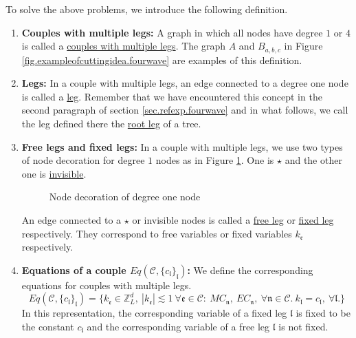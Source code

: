 To solve the above problems, we introduce the following definition.

\begin{defn}\label{def.couplemultileg.fourwave}
\begin{enumerate}
 \item \textbf{Couples with multiple legs:} A graph in which all nodes have degree $1$ or $4$ is called a \underline{couples with multiple legs}. The graph $A$ and $B_{a,b,c}$ in Figure \ref{fig.exampleofcuttingidea.fourwave} are examples of this definition.
 \item \textbf{Legs:} In a couple with multiple legs, an edge connected to a degree one node is called a \underline{leg}. Remember that we have encountered this concept in the second paragraph of section \ref{sec.refexp.fourwave} and in what follows, we call the leg defined there the \underline{root leg} of a tree. 
 \item \textbf{Free legs and fixed legs:} In a couple with multiple legs, we use two types of node decoration for degree $1$ nodes as in Figure \ref{fig.decorationdegreeone.fourwave}. One is $\star$ and the other one is \underline{invisible}. 
 \begin{figure}[H]
 \centering
 \caption{Node decoration of degree one node}
 \label{fig.decorationdegreeone.fourwave}
 \end{figure}
 An edge connected to a $\star$ or invisible nodes is called a \underline{free leg} or \underline{fixed leg} respectively. They correspond to free variables or fixed variables $k_{\mathfrak{e}}$ respectively.
 
 
 \item \textbf{Equations of a couple $Eq(\mathcal{C},\{c_{\mathfrak{l}}\}_{\mathfrak{l}})$:} We define the corresponding equations for couples with multiple legs.
 \begin{equation}\label{eq.Eq(C,c).fourwave}
 Eq(\mathcal{C},\{c_{\mathfrak{l}}\}_{\mathfrak{l}})=\{k_{\mathfrak{e}}\in \mathbb{Z}^d_L,\ |k_{\mathfrak{e}}|\lesssim 1\ \forall \mathfrak{e}\in \mathcal{C}:\ MC_{\mathfrak{n}},\  EC_{\mathfrak{n}},\ \forall \mathfrak{n}\in \mathcal{C}.\ k_{\mathfrak{l}}=c_{\mathfrak{l}},\ \forall \mathfrak{l}.\} 
 \end{equation}
 In this representation, the corresponding variable of a fixed leg $\mathfrak{l}$ is fixed to be the constant $c_{\mathfrak{l}}$ and the corresponding variable of a free leg $\mathfrak{l}$ is not fixed.
\end{enumerate}
\end{defn}

